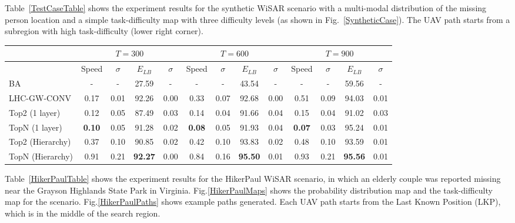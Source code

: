 
Table~\ref{TestCaseTable} shows the experiment results for the synthetic WiSAR scenario with a multi-modal distribution of the missing person location and a simple task-difficulty map with three difficulty levels (as shown in Fig.~\ref{SyntheticCase}). The UAV path starts from a subregion with high task-difficulty (lower right corner).

\begin{center}
\begin{table*}[hbtp]
{
\scriptsize
\hfill{}
\setlength{\extrarowheight}{1.5pt}
\begin{tabular}
{|l|c|c|c|c|c|c|c|c|c|c|c|c|}
\hline
& \multicolumn{4}{|c|}{$T=300$} & \multicolumn{4}{|c|}{$T=600$} & \multicolumn{4}{|c|}{$T=900$} \\ 
\hline
& Speed & $\sigma$ & $\mathit{E_{LB}}$ & $\sigma$ & Speed & $\sigma$ & $\mathit{E_{LB}}$ & $\sigma$ & Speed & $\sigma$ & $\mathit{E_{LB}}$ & $\sigma$\\ 
\hline
BA & - & - & 27.59 & - & - & - & 43.54 & - & - & - & 59.56 & - \\ 
\hline
LHC-GW-CONV & 0.17 & 0.01 & 92.26 & 0.00 & 0.33 & 0.07 & 92.68 & 0.00 & 0.51 & 0.09 & 94.03 & 0.01 \\ 
\hline
Top2 (1 layer) & 0.12 & 0.05 & 87.49 & 0.03 & 0.14 & 0.04 & 91.66 & 0.04 & 0.15 & 0.04 & 91.02 & 0.03 \\ 
\hline
TopN (1 layer) & \textbf{0.10} & 0.05 & 91.28 & 0.02 & \textbf{0.08} & 0.05 & 91.93 & 0.04 & \textbf{0.07} & 0.03 & 95.24 & 0.01 \\ 
\hline
Top2 (Hierarchy) & 0.37 & 0.10 & 90.85 & 0.02 & 0.42 & 0.10 & 93.83 & 0.02 & 0.48 & 0.10 & 93.59 & 0.01  \\ 
\hline
TopN (Hierarchy) & 0.91 & 0.21 & \textbf{92.27} & 0.00 & 0.84 & 0.16 & \textbf{95.50} & 0.01 & 0.93 & 0.21 & \textbf{95.56} & 0.01 \\ 
\hline
\end{tabular}}
\medskip
\caption{Algorithms speed and $\mathit{Efficiency_{LB}}$ comparison for the multi-modal synthetic scenario.}
\label{TestCaseTable}
\vspace*{-5ex}
\end{table*}
\end{center}


Table~\ref{HikerPaulTable} shows the experiment results for the HikerPaul WiSAR scenario, in which an elderly couple was reported missing near the Grayson Highlands State Park in Virginia. Fig.\ref{HikerPaulMaps} shows the probability distribution map and the task-difficulty map for the scenario. Fig.\ref{HikerPaulPaths} shows example paths generated. Each UAV path starts from the Last Known Position (LKP), which is in the middle of the search region.


